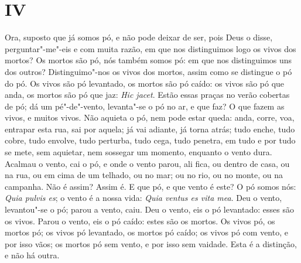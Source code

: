 \section{IV}

Ora, suposto que já somos pó, e não pode deixar de ser, pois Deus o
disse, perguntar"-me"-eis e com muita razão, em que nos distinguimos logo
os vivos dos mortos? Os mortos são pó, nós também somos pó: em que nos
distinguimos uns dos outros? Distinguimo"-nos os vivos dos mortos, assim
como se distingue o pó do pó. Os vivos são pó levantado, os mortos são
pó caído: os vivos são pó que anda, os mortos são pó que jaz: \emph{Hic
jacet}. Estão essas praças no verão cobertas de pó; dá um pé"-de"-vento,
levanta"-se o pó no ar, e que faz? O que fazem as vivos, e muitos vivos.
Não aquieta o pó, nem pode estar queda: anda, corre, voa, entrapar esta
rua, sai por aquela; já vai adiante, já torna atrás; tudo enche, tudo
cobre, tudo envolve, tudo perturba, tudo cega, tudo penetra, em tudo e
por tudo se mete, sem aquietar, nem sossegar um momento, enquanto o
vento dura. Acalmau o vento, cai o pó, e onde o vento parou, ali fica,
ou dentro de casa, ou na rua, ou em cima de um telhado, ou no mar; ou no
rio, ou no monte, ou na campanha. Não é assim? Assim é. E que pó, e que
vento é este? O pó somos nós:
\emph{Quia pulvis es}; o vento é a nossa vida: \emph{Quia ventus es vita
mea}. Deu o vento, levantou"-se o pó; parou a vento, caiu. Deu o %
vento, eis o pó levantado: esses são os vivos. Parou o vento, eis o pó
caído: estes são os mortos. Os vivos pó, os mortos pó; os vivos pó
levantado, os mortos pó caído; os vivos pó com vento, e por isso vãos;
os mortos pó sem vento, e por isso sem vaidade. Esta é a distinção, e
não há outra.

